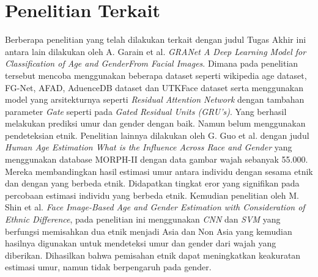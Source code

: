 \section{Penelitian Terkait}
\label{sec:penelitianterkait}


Berberapa penelitian yang telah dilakukan terkait dengan judul Tugas Akhir ini antara lain dilakukan oleh 
A. Garain et al. \textit{GRANet A Deep Learning Model for Classification of Age and GenderFrom Facial Images}. 
Dimana pada penelitian tersebut mencoba menggunakan beberapa dataset seperti wikipedia age dataset, 
FG-Net, AFAD, AduenceDB dataset dan UTKFace dataset serta menggunakan model yang arsitekturnya seperti 
\textit{Residual Attention Network} dengan tambahan parameter \textit{Gate} seperti pada \textit{Gated Residual Units (GRU’s)}. 
Yang berhasil melakukan prediksi umur dan gender dengan baik. Namun belum menggunakan pendeteksian etnik\citep{Granet}. 
Penelitian lainnya dilakukan oleh G. Guo et al. dengan judul \textit{Human Age Estimation What is the Influence 
Across Race and Gender} yang menggunakan database MORPH-II dengan data gambar wajah sebanyak 55.000. 
Mereka membandingkan hasil estimasi umur antara individu dengan sesama etnik dan dengan yang berbeda 
etnik. Didapatkan tingkat eror yang signifikan pada percobaan estimasi individu  yang  berbeda etnik\citep{AgeGender}. 
Kemudian penelitian oleh M. Shin et al. \textit{Face Image-Based Age and Gender Estimation with Consideration of 
Ethnic Difference}, pada penelitian ini menggunakan \textit{CNN} dan \textit{SVM} yang berfungsi memisahkan dua etnik 
menjadi Asia dan Non Asia yang kemudian hasilnya digunakan untuk mendeteksi umur dan gender dari wajah 
yang diberikan. Dihasilkan bahwa pemisahan etnik dapat meningkatkan keakuratan estimasi umur, namun tidak 
berpengaruh pada gender\citep{HumanAgeEst}.
